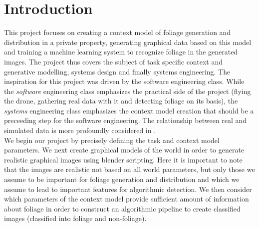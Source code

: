 \documentclass[fleqn,10pt]{SelfArx} %
\affiliation{*\textit{Goethe University, Frankfurt am Main}} %
\affiliation{\textsuperscript{1} ipliush@stud.uni-frankfurt.de} %
\affiliation{\textsuperscript{2} s4811888@stud.uni-frankfurt.de}
\affiliation{\textsuperscript{3} s5401424@stud.uni-frankfurt.de}
\begin{document}
\flushbottom %

\maketitle %

\tableofcontents %

\thispagestyle{empty} %


\section*{Introduction} %


This project focuses on creating a context model of foliage generation and distribution in a private property, generating graphical data based on this model and training a machine learning system to recognize foliage in the generated images. The project thus covers the subject of task specific context and generative modelling, systems design and finally systems engineering. The inspiration for this project was driven by the software engineering class. While the \emph{software} engineering class emphasizes the practical side of the project (flying the drone, gathering real data with it and detecting foliage on its basis), the \emph{systems} engineering class emphasizes the context model creation that should be a preceeding step for the software engineering. The relationship between real and simulated data is more profoundly considered in \cite{Subu:2015}. \\
We begin our project by precisely defining the task and context model parameters. We next create graphical models of the world in order to generate realistic graphical images using blender scripting. Here it is important to note that the images are realistic not based on all world parameters, but only those we assume to be important for foliage generation and distribution and which we assume to lead to important features for algorithmic detection.  We then consider which parameters of the context model provide sufficient amount of information about foliage in order to construct an algorithmic pipeline to create classified images (classified into foliage and non-foliage).
\end{document}
